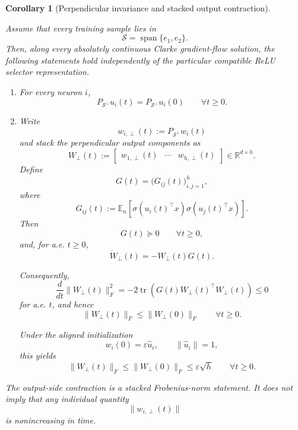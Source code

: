 \documentclass{article} %
\theoremstyle{plain}
\newtheorem{corollary}[theorem]{Corollary}
\theoremstyle{definition}
\theoremstyle{remark}
\begin{document}
\begin{corollary}[Perpendicular invariance and stacked output contraction]
\label{cor:perp-dynamics}

Assume that every training sample lies in
\[
\mathcal S
=
\operatorname{span}\{e_1,e_2\}.
\]
Then, along every absolutely continuous Clarke gradient-flow solution, the
following statements hold independently of the particular compatible ReLU
selector representation.

\begin{enumerate}[label=(\roman*),leftmargin=2.4em]

\item
For every neuron $i$,
\[
\boxed{
P_{\mathcal S^\perp}u_i(t)
=
P_{\mathcal S^\perp}u_i(0)
}
\qquad
\forall t\ge0.
\]

\item
Write
\[
w_{i,\perp}(t)
:=
P_{\mathcal S^\perp}w_i(t)
\]
and stack the perpendicular output components as
\[
W_\perp(t)
:=
\begin{bmatrix}
w_{1,\perp}(t)
&
\cdots
&
w_{h,\perp}(t)
\end{bmatrix}
\in\mathbb R^{d\times h}.
\]
Define
\[
G(t)
=
\bigl(
G_{ij}(t)
\bigr)_{i,j=1}^h,
\]
where
\[
G_{ij}(t)
:=
\mathbb E_n
\left[
\sigma(u_i(t)^\top x)
\sigma(u_j(t)^\top x)
\right].
\]
Then
\[
\boxed{
G(t)\succeq0
}
\qquad
\forall t\ge0,
\]
and, for a.e. $t\ge0$,
\[
\boxed{
\dot W_\perp(t)
=
-W_\perp(t)G(t).
}
\]

Consequently,
\[
\boxed{
\frac{d}{dt}
\|W_\perp(t)\|_F^2
=
-2
\operatorname{tr}
\left(
G(t)
W_\perp(t)^\top W_\perp(t)
\right)
\le0
}
\]
for a.e. $t$, and hence
\[
\boxed{
\|W_\perp(t)\|_F
\le
\|W_\perp(0)\|_F
}
\qquad
\forall t\ge0.
\]

Under the aligned initialization
\[
w_i(0)
=
\varepsilon\widehat u_i,
\qquad
\|\widehat u_i\|=1,
\]
this yields
\[
\boxed{
\|W_\perp(t)\|_F
\le
\|W_\perp(0)\|_F
\le
\varepsilon\sqrt h
}
\qquad
\forall t\ge0.
\]

\end{enumerate}

The output-side contraction is a \emph{stacked Frobenius-norm statement}.
It does not imply that any individual quantity
\[
\|w_{i,\perp}(t)\|
\]
is nonincreasing in time.
\end{corollary}
\end{document}
